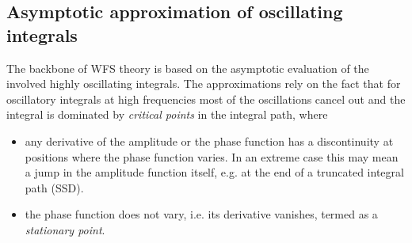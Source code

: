 \documentclass[lettersize,journal]{IEEEtran}
\begin{document}
\subsection{Asymptotic approximation of oscillating integrals}
The backbone of WFS theory is based on the asymptotic evaluation of the involved highly oscillating integrals.
The approximations rely on the fact that for oscillatory integrals at high frequencies most of the oscillations cancel out and the integral is dominated by \emph{critical points} in the integral path, where
\begin{itemize}
  \item any derivative of the amplitude or the phase function has a discontinuity at positions where the phase function varies.
  In an extreme case this may mean a jump in the amplitude function itself, e.g. at the end of a truncated integral path (SSD).
  \item the phase function does not vary, i.e. its derivative vanishes, termed as a \emph{stationary point}.
\end{itemize}
\end{document}
